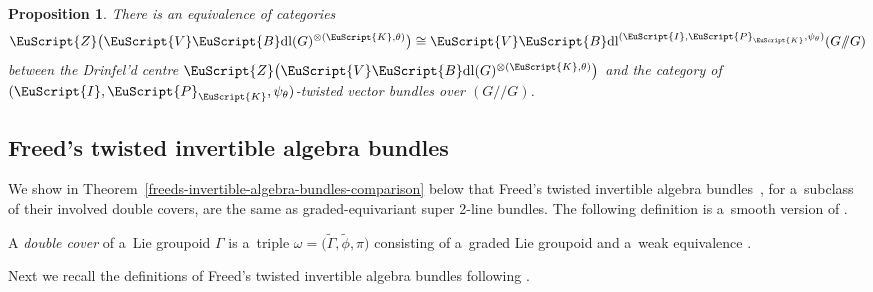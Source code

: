 \documentclass[10pt,a4paper]{amsart}
\numberwithin{equation}{section}
\newtheorem{Proposition}[Theorem]{Proposition}
 { \theoremstyle{definition}
\newtheorem{Definition}[Theorem]{Definition}
\newtheorem{Example}[Theorem]{Example}
\newtheorem{Remark}[Theorem]{Remark} }
\def\mathscr#1{\EuScript{#1}}
\def\act#1#2{#1/\!\!/#2}
\newcommand{\VectBdl}{\mathscr{V}\mathscr{B}\mathrm{dl}}
\begin{document}
\begin{Proposition}
There is an equivalence of categories
 \begin{equation*}
 \mathscr{Z}\bigl(\VectBdl(G)^{\otimes (\mathscr{K},\theta)}\bigr) \cong \VectBdl^{(\mathscr{I},\mathscr{P}_{\mathscr{K}},\psi_{\theta})}(\act GG)
 \end{equation*}
 between the Drinfel'd centre $\mathscr{Z}\bigl(\VectBdl(G)^{\otimes (\mathscr{K},\theta)}\bigr)$ and the category of $(\mathscr{I},\mathscr{P}_{\mathscr{K}},\psi_{\theta})$-twisted
 vector bundles over $(\act GG)$.
\end{Proposition}

\subsection{Freed's twisted invertible algebra bundles}
\label{Freed's invertible algebra bundle twistings}

We show in Theorem~\ref{freeds-invertible-algebra-bundles-comparison} below that Freed's twisted invertible algebra bundles~\cite{Freed2012a}, for a~subclass of their involved double covers, are the same as graded-equivariant super 2-line bundles.
The following definition is a~smooth version of \cite[Definition~1.95]{Freed2012a}.

\begin{Definition} \label{Definition: double cover}
 A \emph{double cover} of a~Lie groupoid $\Gamma$ is a~triple $\omega=\bigl(\tilde\Gamma,\tilde\phi,\pi\bigr)$ consisting of a~graded Lie groupoid \smash{$\bigl(\tilde \Gamma,\tilde \phi\bigr)$} and a~weak equivalence \smash{$\pi\colon \tilde \Gamma \to \Gamma$}. \end{Definition}

Next we recall the definitions of Freed's twisted invertible algebra bundles following {\cite[Definitions~1.59 and~1.99]{Freed2012a}}.
\end{document}
